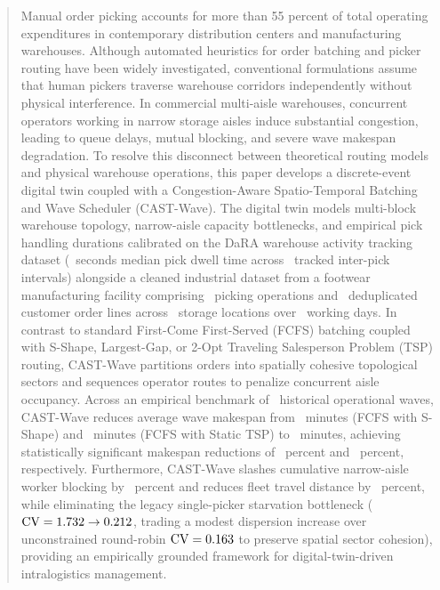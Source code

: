 \documentclass[conference]{IEEEtran}
\begin{document}
\begin{abstract}
Manual order picking accounts for more than 55 percent of total operating expenditures in contemporary distribution centers and manufacturing warehouses. Although automated heuristics for order batching and picker routing have been widely investigated, conventional formulations assume that human pickers traverse warehouse corridors independently without physical interference. In commercial multi-aisle warehouses, concurrent operators working in narrow storage aisles induce substantial congestion, leading to queue delays, mutual blocking, and severe wave makespan degradation. To resolve this disconnect between theoretical routing models and physical warehouse operations, this paper develops a discrete-event digital twin coupled with a Congestion-Aware Spatio-Temporal Batching and Wave Scheduler (CAST-Wave). The digital twin models multi-block warehouse topology, narrow-aisle capacity bottlenecks, and empirical pick handling durations calibrated on the DaRA warehouse activity tracking dataset (\CalibratedPickDwell~seconds median pick dwell time across \DaRAValidGaps~tracked inter-pick intervals) alongside a cleaned industrial dataset from a footwear manufacturing facility comprising \TotalPicks~picking operations and \TotalOrderLines~deduplicated customer order lines across \TotalLocations~storage locations over \TotalOperationalDays~working days. In contrast to standard First-Come First-Served (FCFS) batching coupled with S-Shape, Largest-Gap, or 2-Opt Traveling Salesperson Problem (TSP) routing, CAST-Wave partitions orders into spatially cohesive topological sectors and sequences operator routes to penalize concurrent aisle occupancy. Across an empirical benchmark of \BenchmarkWaves~historical operational waves, CAST-Wave reduces average wave makespan from \MakespanSShapeMin~minutes (FCFS with S-Shape) and \MakespanTSPMin~minutes (FCFS with Static TSP) to \MakespanCASTMin~minutes, achieving statistically significant makespan reductions of \MakespanRedSShapePct~percent and \MakespanRedTSPPct~percent, respectively. Furthermore, CAST-Wave slashes cumulative narrow-aisle worker blocking by \BlockedTimeReductionPct~percent and reduces fleet travel distance by \DistanceImprovementVsSShape~percent, while eliminating the legacy single-picker starvation bottleneck ($\text{CV} = \WorkloadCVLegacy \to \WorkloadCVCAST$, trading a modest dispersion increase over unconstrained round-robin $\text{CV} = \WorkloadCVFairRR$ to preserve spatial sector cohesion), providing an empirically grounded framework for digital-twin-driven intralogistics management.
\end{abstract}
\end{document}
